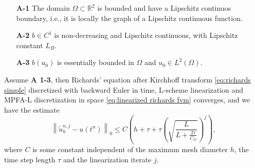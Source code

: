\documentclass[../Main/main.tex]{subfiles}
\begin{document}
	\begin{itemize}
		\item[\textbf{A-1}] The domain $\Omega\subset \mathbb{R}^2$ is bounded and have a Lipschitz continuos boundary, i.e., it is locally the graph of a Lipschitz continuous function.
		\item[\textbf{A-2}] $b\in C^1$ is non-decreasing and Lipschitz continuous, with Lipschitz constant $L_B$.
		\item[\textbf{A-3}] $b(u_0)$ is essentially bounded in $\Omega$ and $u_0 \in L^2(\Omega)$.
	\end{itemize}
	\begin{theorem}
		Assume \textbf{A 1-3}, then
		Richards' equation after Kirchhoff transform \eqref{eq:richards simple} discretized with backward Euler in time, L-scheme linearization and MPFA-L discretization in space \eqref{eq:linearized richards fvm} converges, and we have the estimate
		\begin{equation}\label{eq:richards_estimate}
			\left \|\tilde{u}_h^{n,j}-u(t^n)\right \|_0 \leq C \left(h+\tau + \tau \left(\sqrt{\frac{L}{L+\frac{2\tau}{C_{\Omega}}}} \right)^j \right),
		\end{equation}
		where $C$ is some constant independent of the maximum mesh diameter $h$, the time step length $\tau$ and the linearization iterate $j$.
	\end{theorem}
\end{document}
